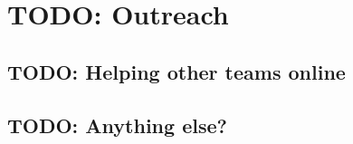\section{TODO: Outreach}
\subsection{TODO: Helping other teams online}
\subsection{TODO: Anything else?}
